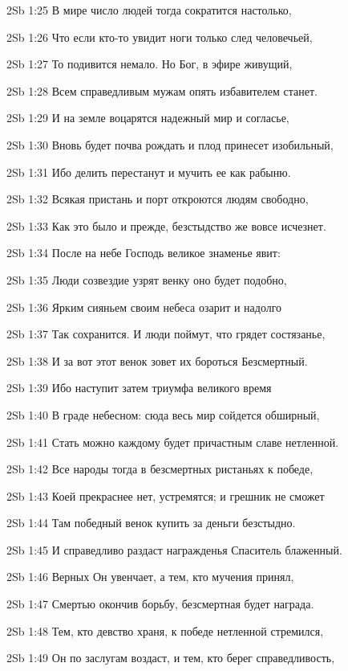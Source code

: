 \vs 2Sb 1:25 В мире число людей тогда сократится настолько,

\vs 2Sb 1:26 Что если кто-то увидит ноги только след человечьей, 

\vs 2Sb 1:27 То подивится немало. Но Бог, в эфире живущий, 

\vs 2Sb 1:28 Всем справедливым мужам опять избавителем станет. 

\vs 2Sb 1:29 И на земле воцарятся надежный мир и согласье, 

\vs 2Sb 1:30 Вновь будет почва рождать и плод принесет изобильный, 

\vs 2Sb 1:31 Ибо делить перестанут и мучить ее как рабыню. 

\vs 2Sb 1:32 Всякая пристань и порт откроются людям свободно, 

\vs 2Sb 1:33 Как это было и прежде, безстыдство же вовсе исчезнет.

\vs 2Sb 1:34 После на небе Господь великое знаменье явит:

\vs 2Sb 1:35 Люди созвездие узрят  венку оно будет подобно, 

\vs 2Sb 1:36 Ярким сияньем своим небеса озарит и надолго 

\vs 2Sb 1:37 Так сохранится. И люди поймут, что грядет состязанье, 

\vs 2Sb 1:38 И за вот этот венок зовет их бороться Безсмертный. 

\vs 2Sb 1:39 Ибо наступит затем триумфа великого время

\vs 2Sb 1:40 В граде небесном: сюда весь мир сойдется обширный, 

\vs 2Sb 1:41 Стать можно каждому будет причастным славе нетленной. 

\vs 2Sb 1:42 Все народы тогда в безсмертных ристаньях к победе, 

\vs 2Sb 1:43 Коей прекраснее нет, устремятся; и грешник не сможет 

\vs 2Sb 1:44 Там победный венок купить за деньги безстыдно.

\vs 2Sb 1:45 И справедливо раздаст награжденья Спаситель блаженный. 

\vs 2Sb 1:46 Верных Он увенчает, а тем, кто мучения принял, 

\vs 2Sb 1:47 Смертью окончив борьбу, безсмертная будет награда. 

\vs 2Sb 1:48 Тем, кто девство храня, к победе нетленной стремился, 

\vs 2Sb 1:49 Он по заслугам воздаст, и тем, кто берег справедливость,

